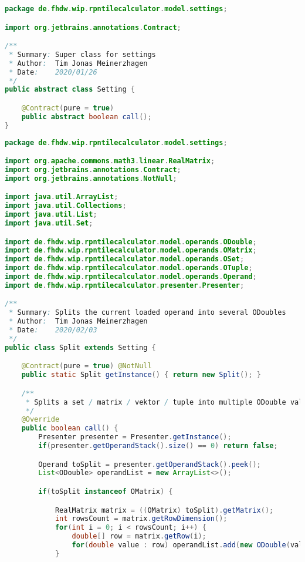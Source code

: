 \begin{lstlisting}[caption=Setting (Meinerzhagen),label=list:Setting,language=Java]
package de.fhdw.wip.rpntilecalculator.model.settings;

import org.jetbrains.annotations.Contract;

/**
 * Summary: Super class for settings
 * Author:  Tim Jonas Meinerzhagen
 * Date:    2020/01/26
 */
public abstract class Setting {

    @Contract(pure = true)
    public abstract boolean call();
}

\end{lstlisting}    

\begin{lstlisting}[caption=Split (Meinerzhagen),label=list:Split,language=Java]
package de.fhdw.wip.rpntilecalculator.model.settings;

import org.apache.commons.math3.linear.RealMatrix;
import org.jetbrains.annotations.Contract;
import org.jetbrains.annotations.NotNull;

import java.util.ArrayList;
import java.util.Collections;
import java.util.List;
import java.util.Set;

import de.fhdw.wip.rpntilecalculator.model.operands.ODouble;
import de.fhdw.wip.rpntilecalculator.model.operands.OMatrix;
import de.fhdw.wip.rpntilecalculator.model.operands.OSet;
import de.fhdw.wip.rpntilecalculator.model.operands.OTuple;
import de.fhdw.wip.rpntilecalculator.model.operands.Operand;
import de.fhdw.wip.rpntilecalculator.presenter.Presenter;

/**
 * Summary: Splits the current loaded operand into several ODoubles
 * Author:  Tim Jonas Meinerzhagen
 * Date:    2020/02/03
 */
public class Split extends Setting {

    @Contract(pure = true) @NotNull
    public static Split getInstance() { return new Split(); }

    /**
     * Splits a set / matrix / vektor / tuple into multiple ODouble values
     */
    @Override
    public boolean call() {
        Presenter presenter = Presenter.getInstance();
        if(presenter.getOperandStack().size() == 0) return false;

        Operand toSplit = presenter.getOperandStack().peek();
        List<ODouble> operandList = new ArrayList<>();

        if(toSplit instanceof OMatrix) {

            RealMatrix matrix = ((OMatrix) toSplit).getMatrix();
            int rowsCount = matrix.getRowDimension();
            for(int i = 0; i < rowsCount; i++) {
                double[] row = matrix.getRow(i);
                for(double value : row) operandList.add(new ODouble(value));
            }


\end{lstlisting}

